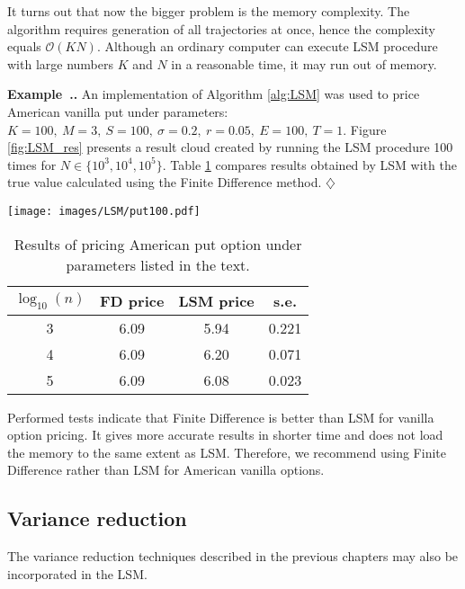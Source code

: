 \documentclass[a4paper,11pt, twoside]{book}
\theoremstyle{definition}
\theoremstyle{remark}
\newcounter{example}[chapter]
\newenvironment{example}
   {\refstepcounter{example} \par\medskip\noindent \textbf{Example~\arabic{chapter}.\arabic{example}.}  }
   {\hfill $\diamondsuit$\par\noindent\ignorespacesafterend}
\begin{document}
It turns out that now the bigger problem is the memory complexity. The algorithm requires generation of all trajectories at once, hence the complexity equals $\mathcal{O}(KN)$. Although an ordinary computer can execute LSM procedure with large numbers $K$ and $N$ in a reasonable time, it may run out of memory.

\begin{example}
 An implementation of Algorithm \ref{alg:LSM} was used to price American vanilla put under parameters: $K=100,\ M=3,\ S=100,\ \sigma=0.2,\ r=0.05,\ E=100,\ T=1$. Figure \ref{fig:LSM_res} presents a result cloud created by running the LSM procedure 100 times for $N \in \{10^3, 10^4, 10^5\}$. Table \ref{tab:LSM_res} compares results obtained by LSM with the true value calculated using the Finite Difference method. 
\end{example}

\begin{SCfigure}[][h]
\centering
 \texttt{[image: images/LSM/put100.pdf]}
\caption{The dispersion of the results obtained by executing the LSM procedure for different numbers of simulations. For each each $N$, the procedure was run 100 times. Hence for each $N$ we obtained 100 estimations of the price. Small points indicate obtained values. }
\label{fig:LSM_res}
\end{SCfigure}

\begin{table}[!ht]
\centering
 \caption{Results of pricing American put option under parameters listed in the text.}
 \label{tab:LSM_res}
\begin{tabular} {||c | c | c | c ||}  
 \hline 
  $\log_{10}(n)$ & FD price & LSM price & s.e. \\ \hline
  3 & 6.09 & 5.94 & 0.221 \\ \hline 
  4 & 6.09 & 6.20 & 0.071 \\ \hline 
  5 & 6.09 & 6.08 & 0.023 \\ \hline 
\end{tabular}  
\end{table}

Performed tests indicate that Finite Difference is better than LSM for vanilla option pricing. It gives more accurate results in shorter time and does not load the memory to the same extent as LSM. Therefore, we recommend using Finite Difference rather than LSM for American vanilla options.

\subsection{Variance reduction}
The variance reduction techniques described in the previous chapters may also be incorporated in the LSM.
\end{document}
